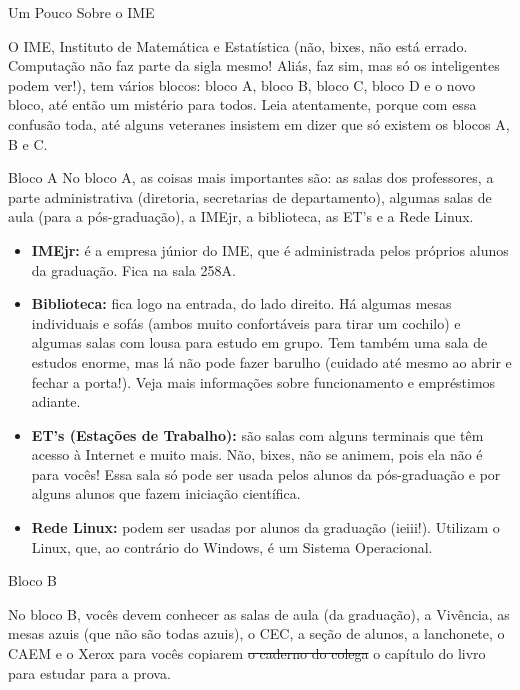 \begin{secao}{Um Pouco Sobre o IME}

O IME, Instituto de Matemática e Estatística (não, bixes, não está errado.
Computação não faz parte da sigla mesmo! Aliás, faz sim, mas só os inteligentes
podem ver!), tem vários blocos: bloco A, bloco B, bloco C, bloco D e o
novo bloco, até então um mistério para todos. Leia atentamente, porque com essa
confusão toda, até alguns veteranes insistem em dizer que só existem os blocos
A, B e C.


\begin{subsecao}{Bloco A}
No bloco A, as coisas mais importantes são: as salas dos professores, a parte
administrativa (diretoria, secretarias de departamento), algumas salas de aula
(para a pós-graduação), a IMEjr, a biblioteca, as ET's e a Rede Linux.

\begin{itemize}

\item {\bf IMEjr:} é a empresa júnior do IME, que é administrada pelos próprios
alunos da graduação. Fica na sala 258A.

\item {\bf Biblioteca:} fica logo na entrada, do lado direito. Há algumas mesas
individuais e sofás (ambos muito confortáveis para tirar um cochilo) e algumas salas
com lousa para estudo em grupo. Tem também uma sala de estudos enorme, 
mas lá não pode fazer barulho (cuidado até mesmo ao abrir e fechar a porta!).
Veja mais informações sobre funcionamento e empréstimos adiante.

\item {\bf ET's (Estações de Trabalho):} são salas com alguns terminais que têm
acesso à Internet e muito mais. Não, bixes, não se animem, pois ela não é para
vocês! Essa sala só pode ser usada pelos alunos da pós-graduação e por alguns
alunos que fazem iniciação científica.

\item {\bf Rede Linux:} podem ser usadas por alunos da graduação (ieiii!).
Utilizam o Linux, que, ao contrário do Windows, é um Sistema Operacional.

\end{itemize}

\end{subsecao}

\begin{subsecao}{Bloco B}


No bloco B, vocês devem conhecer as salas de aula (da graduação), a Vivência, as
mesas azuis (que não são todas azuis), o CEC, a seção de alunos, a lanchonete, 
o CAEM e o Xerox para vocês copiarem \sout{o caderno do colega} o capítulo do 
livro para estudar para a prova.


\end{subsecao}
\end{secao}
